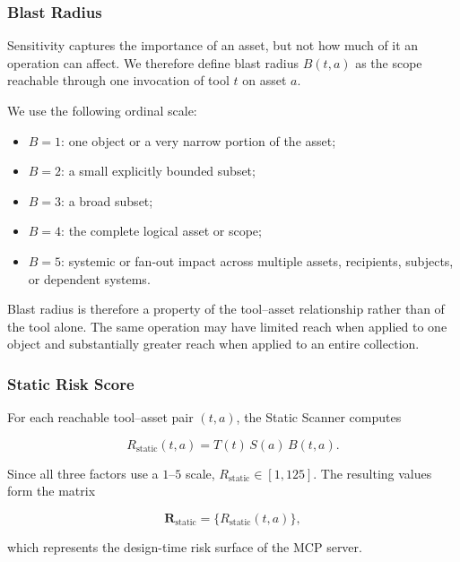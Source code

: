 \documentclass[sigconf]{acmart}
\begin{document}
\subsubsection{Blast Radius}
\label{sec:blast}

Sensitivity captures the importance of an asset, but not how much of it an
operation can affect. We therefore define blast radius $B(t,a)$ as the scope
reachable through one invocation of tool $t$ on asset $a$.

We use the following ordinal scale:

\begin{itemize}
    \item $B=1$: one object or a very narrow portion of the asset;
    \item $B=2$: a small explicitly bounded subset;
    \item $B=3$: a broad subset;
    \item $B=4$: the complete logical asset or scope;
    \item $B=5$: systemic or fan-out impact across multiple assets,
          recipients, subjects, or dependent systems.
\end{itemize}

Blast radius is therefore a property of the tool--asset relationship rather
than of the tool alone. The same operation may have limited reach when applied
to one object and substantially greater reach when applied to an entire
collection.


\subsubsection{Static Risk Score}
\label{sec:static-score}

For each reachable tool--asset pair $(t,a)$, the Static Scanner computes

\begin{equation}
R_{\mathrm{static}}(t,a)
=
T(t)\,S(a)\,B(t,a).
\label{eq:static-risk}
\end{equation}

Since all three factors use a $1$--$5$ scale,
$R_{\mathrm{static}}\in[1,125]$. The resulting values form the matrix

\begin{equation}
\mathbf{R}_{\mathrm{static}}
=
\{R_{\mathrm{static}}(t,a)\},
\end{equation}

which represents the design-time risk surface of the MCP server.
\end{document}
